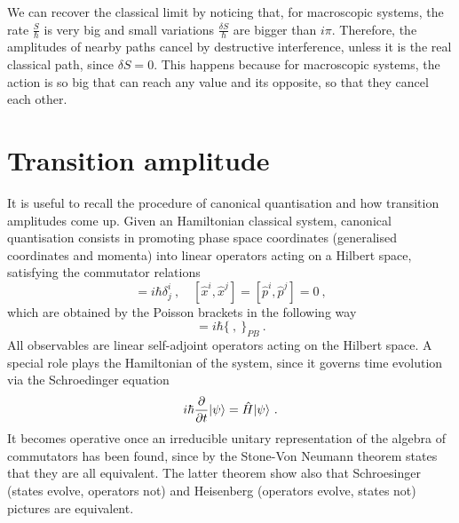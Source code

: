     We can recover the classical limit by noticing that, for macroscopic systems, the rate $\frac{S}{\hbar}$ is very big and small variations $\frac{\delta S}{\hbar}$ are bigger than $i \pi$. Therefore, the amplitudes of nearby paths cancel by destructive interference, unless it is the real classical path, since $\delta S = 0$. This happens because for macroscopic systems, the action is so big that can reach any value and its opposite, so that they cancel each other.

\section{Transition amplitude}

    It is useful to recall the procedure of canonical quantisation and how transition amplitudes come up. Given an Hamiltonian classical system, canonical quantisation consists in promoting phase space coordinates (generalised coordinates and momenta) into linear operators acting on a Hilbert space, satisfying the commutator relations 
    \begin{equation*}
        [\hat x^i, \hat p_j] = i \hbar \delta^i_j ~, \quad [\hat x^i, \hat x^j] = [\hat p^i, \hat p^j] = 0 ~,
    \end{equation*}
    which are obtained by the Poisson brackets in the following way
    \begin{equation*}
        [ ~ , ~ ] = i \hbar \{~ , ~\}_{PB} ~.
    \end{equation*}
    All observables are linear self-adjoint operators acting on the Hilbert space. A special role plays the Hamiltonian of the system, since it governs time evolution via the Schroedinger equation 
    \begin{equation*}
        i \hbar \frac{\partial}{\partial t} \vert\psi\rangle = \hat H \vert\psi\rangle ~.
    \end{equation*} 
    It becomes operative once an irreducible unitary representation of the algebra of commutators has been found, since by the Stone-Von Neumann theorem states that they are all equivalent. The latter theorem show also that Schroesinger (states evolve, operators not) and Heisenberg (operators evolve, states not) pictures are equivalent.

